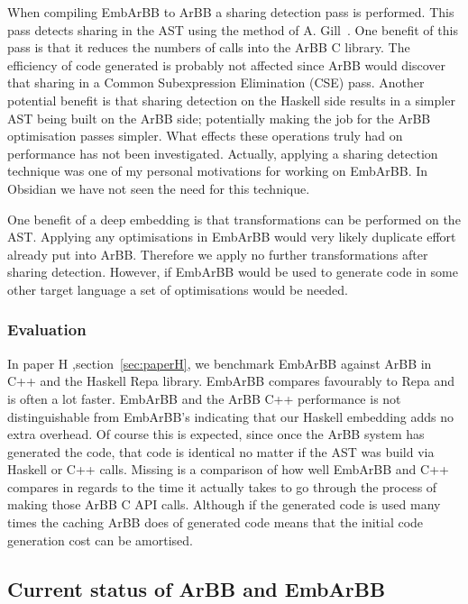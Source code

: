 \documentclass[a4paper]{book}
\begin{document}
When compiling EmbArBB to ArBB a sharing detection pass is performed. This pass detects 
sharing in the AST using the method of A. Gill~\citet{Gill}. One benefit of this pass 
is that it reduces the numbers of calls into the ArBB C library. The efficiency of code 
generated is probably not affected since ArBB would discover that sharing in a Common 
Subexpression Elimination (CSE) pass. Another potential benefit is that sharing detection 
on the Haskell side results in a simpler AST being built on the ArBB side; potentially making 
the job for the ArBB optimisation passes simpler. What effects these 
operations truly had on performance has not been investigated. Actually, applying a sharing 
detection technique was one of my personal motivations for working on EmbArBB. In Obsidian 
we have not seen the need for this technique.

One benefit of a deep embedding is that transformations can be performed on the AST. Applying 
any optimisations in EmbArBB would very likely duplicate effort already put into ArBB. 
Therefore we apply no further transformations after sharing detection. However, if EmbArBB 
would be used to generate code in some other target language a set of optimisations 
would be needed.  

\subsubsection{Evaluation} 

In paper H ,section~\ref{sec:paperH}, we benchmark EmbArBB against ArBB in C++ and the Haskell 
Repa library. EmbArBB compares favourably to Repa and is often a lot faster. EmbArBB and the ArBB 
C++ performance is not distinguishable from EmbArBB's indicating that our Haskell embedding 
adds no extra overhead. Of course this is expected, since once the ArBB system has generated 
the code, that code is identical no matter if the AST was build via Haskell or C++ calls. 
Missing is a comparison of how well EmbArBB and C++ compares in regards to the time it actually 
takes to go through the process of making those ArBB C API calls. Although if the generated 
code is used many times the caching ArBB does of generated code means that the initial code 
generation cost can be amortised. 

\subsection{Current status of ArBB and EmbArBB} 
\end{document}
